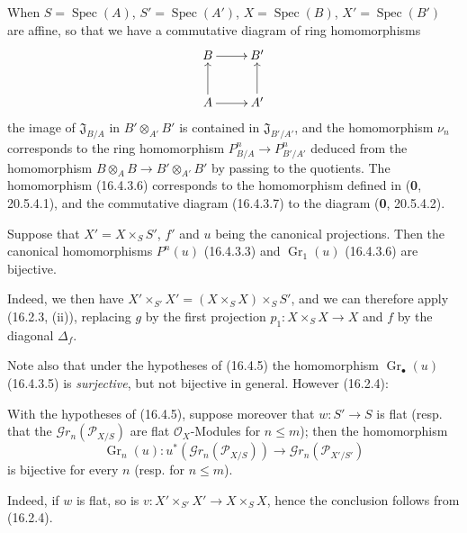 \begin{env}[16.4.4]
\label{IV.16.4.4}
When $S=\operatorname{Spec}(A)$, $S'=\operatorname{Spec}(A')$,
$X=\operatorname{Spec}(B)$, $X'=\operatorname{Spec}(B')$ are affine, so
that we have a commutative diagram of ring homomorphisms
\[
  \xymatrix{
    B \ar[r] & B' \\
    A \ar[u] \ar[r] & A' \ar[u]
  }
\]
the image of $\mathfrak{J}_{B/A}$ in $B'\otimes_{A'}B'$ is contained in
$\mathfrak{J}_{B'/A'}$, and the homomorphism $\nu_n$ corresponds to the ring
homomorphism $P_{B/A}^n\to P_{B'/A'}^n$ deduced from the homomorphism
$B\otimes_A B\to B'\otimes_{A'}B'$ by passing to the quotients. The homomorphism
(16.4.3.6) corresponds to the homomorphism defined in (\textbf{0}, 20.5.4.1), and the
commutative diagram (16.4.3.7) to the diagram (\textbf{0}, 20.5.4.2).
\end{env}

\begin{proposition}[16.4.5]
\label{IV.16.4.5}
Suppose that $X'=X\times_S S'$, $f'$ and $u$ being the canonical projections.
Then the canonical homomorphisms $P^n(u)$ \textup{(16.4.3.3)} and
$\operatorname{Gr}_1(u)$ \textup{(16.4.3.6)} are bijective.
\end{proposition}

Indeed, we then have $X'\times_{S'}X'=(X\times_S X)\times_S S'$, and we can
therefore apply (16.2.3, (ii)), replacing $g$ by the first projection
$p_1:X\times_S X\to X$ and $f$ by the diagonal $\Delta_f$.

Note also that under the hypotheses of (16.4.5) the homomorphism
$\operatorname{Gr}_\bullet(u)$ (16.4.3.5) is \emph{surjective}, but not bijective in
general. However (16.2.4):

\begin{corollary}[16.4.6]
\label{IV.16.4.6}
With the hypotheses of \textup{(16.4.5)}, suppose moreover that $w:S'\to S$ is
flat \textup{(resp.} that the $\mathscr{G}r_n(\mathscr{P}_{X/S})$ are flat
$\mathcal{O}_X$-Modules for $n\leq m$); then the homomorphism
\[
  \operatorname{Gr}_n(u):u^*(\mathscr{G}r_n(\mathscr{P}_{X/S}))
  \longrightarrow\mathscr{G}r_n(\mathscr{P}_{X'/S'})
\]
is bijective for every $n$ \textup{(resp.} for $n\leq m$).
\end{corollary}

Indeed, if $w$ is flat, so is
$v:X'\times_{S'}X'\to X\times_S X$, hence the conclusion follows from (16.2.4).

